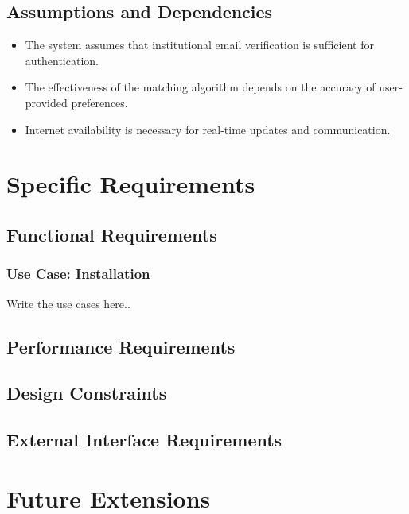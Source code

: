 \documentclass{article}
\begin{document}
\subsection{Assumptions and Dependencies}
\begin{itemize}
    \item The system assumes that institutional email verification is sufficient for authentication.
    \item The effectiveness of the matching algorithm depends on the accuracy of user-provided preferences.
    \item Internet availability is necessary for real-time updates and communication.
\end{itemize}

\section{Specific Requirements}
  \subsection{Functional Requirements}
    \subsubsection{Use Case: Installation}
    Write the use cases here..
  \subsection{Performance Requirements}
  \subsection{Design Constraints}
  \subsection{External Interface Requirements}

\section{Future Extensions}
\end{document}
